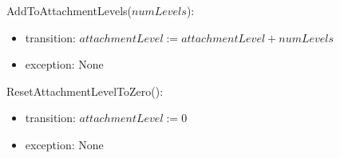 \noindent AddToAttachmentLevels($\mathit{numLevels}$):
\begin{itemize}

    \item transition: $\mathit{attachmentLevel} :=
    \mathit{attachmentLevel} + \mathit{numLevels} $

    \item exception: None

\end{itemize}

\noindent ResetAttachmentLevelToZero():
\begin{itemize}

    \item transition: $\mathit{attachmentLevel} := 0 $

    \item exception: None

\end{itemize}